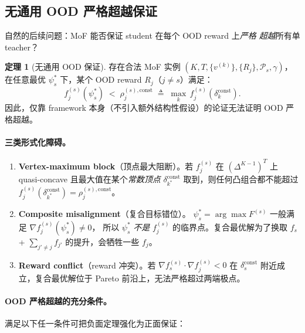 \documentclass[11pt,a4paper]{article}
\newcommand{\const}{\mathrm{const}}
\theoremstyle{definition}
\newtheorem{theorem}{定理}
\begin{document}
\subsection{无通用 OOD 严格超越保证}
\label{ssec:no_ood}

自然的后续问题：MoF 能否保证 student 在每个 OOD reward 上\emph{严格
超越}所有单 teacher？

\begin{theorem}[无通用 OOD 保证]
\label{thm:no_ood}
存在合法 MoF 实例 $(K, T, \{v^{(k)}\}, \{R_j\}, \mathcal{P}_s, \gamma)$，
在任意最优 $\psi^*_s$ 下，某个 OOD reward $R_j$（$j \neq s$）满足：
\begin{equation}
f_j^{(s)}(\psi^*_s) \;<\;
\rho_j^{(s),\const} \;\triangleq\; \max_{k}\,f_j^{(s)}(\delta_k^{\const}).
\end{equation}
因此，仅靠 framework 本身（不引入额外结构性假设）的论证无法证明 OOD
严格超越。
\end{theorem}

\paragraph{三类形式化障碍。}

\begin{enumerate}[leftmargin=1.5em]
\item \textbf{Vertex-maximum block}（顶点最大阻断）。若 $f_j^{(s)}$ 在
$(\Delta^{K-1})^T$ 上 quasi-concave 且最大值在某个\emph{常数顶点}
$\delta_{k^*}^{\const}$ 取到，则任何凸组合都不能超过
$f_j^{(s)}(\delta_{k^*}^{\const}) = \rho_j^{(s),\const}$。

\item \textbf{Composite misalignment}（复合目标错位）。
$\psi^*_s = \arg\max F^{(s)}$ 一般满足 $\nabla f_j^{(s)}(\psi^*_s) \neq 0$，
所以 $\psi^*_s$ \emph{不是} $f_j^{(s)}$ 的临界点。复合最优解为了换取
$f_s$ + $\sum_{j' \neq j} f_{j'}$ 的提升，会牺牲一些 $f_j$。

\item \textbf{Reward conflict}（reward 冲突）。若 $\nabla f_s^{(s)} \cdot
\nabla f_j^{(s)} < 0$ 在 $\delta_s^{\const}$ 附近成立，复合最优解位于
Pareto 前沿上，无法严格超过两端极点。
\end{enumerate}

\paragraph{OOD 严格超越的充分条件。}
满足以下任一条件可把负面定理强化为正面保证：
\end{document}
